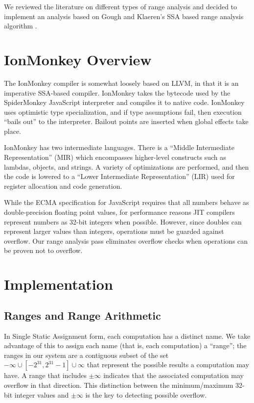 \documentclass{article}
\begin{document}
We reviewed the literature on different types of range analysis and
decided to implement an analysis based on Gough and Klaeren's SSA
based range analysis algorithm \cite{Gough94eliminatingrange}.

\section{IonMonkey Overview}
The IonMonkey compiler is somewhat loosely based on LLVM, in that it is an
imperative SSA-based compiler. IonMonkey takes the bytecode used by the SpiderMonkey
JavaScript interpreter and compiles it to native code. IonMonkey uses optimistic type
specialization, and if type assumptions fail, then execution ``bails
out'' to the interpreter. Bailout points are inserted when global effects take place.

IonMonkey has two intermediate languages. There is a ``Middle
Intermediate Representation'' (MIR) which encompasses higher-level
constructs such as lambdas, objects, and strings. A variety of
optimizations are performed, and then the code is lowered to a ``Lower
Intermediate Representation'' (LIR) used for register allocation and
code generation.

While the ECMA specification for JavaScript requires that all numbers behave as
double-precision floating point values\cite{ECMA-262}, for performance reasons JIT compilers
represent numbers as 32-bit integers when possible. However, since doubles can
represent larger values than integers, operations must be guarded against
overflow.  Our range analysis pass eliminates overflow checks when operations
can be proven not to overflow.

\section{Implementation}

\subsection{Ranges and Range Arithmetic}

In Single Static Assignment form, each computation has a distinct
name. We take advantage of this to assign each name (that is, each
computation) a ``range''; the ranges in our system are a contiguous
subset of the set ${-\infty} \cup [-2^{31}, 2^{31}-1] \cup {\infty}$
that represent the possible results a computation may have. A range
that includes $\pm \infty$ indicates that the associated
computation may overflow in that direction. This distinction between
the minimum/maximum 32-bit integer values and $\pm \infty$ is the key
to detecting possible overflow.
\end{document}
